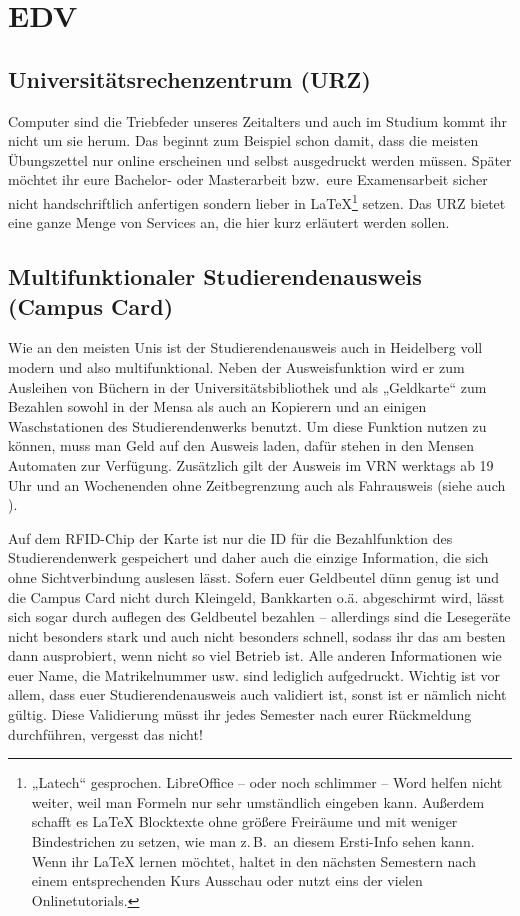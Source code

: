 \section{EDV}

\subsection{Universitätsrechenzentrum (URZ)}
\label{urz}
Computer sind die Triebfeder unseres Zeitalters und auch im Studium kommt ihr nicht um sie herum. Das beginnt zum Beispiel schon damit, dass die meisten Übungszettel nur online erscheinen und selbst ausgedruckt werden müssen. Später möchtet ihr eure Bachelor- oder Masterarbeit bzw.\ eure Examensarbeit sicher nicht handschriftlich anfertigen sondern lieber in \LaTeX \footnote{„Latech“ gesprochen. LibreOffice -- oder noch schlimmer -- Word helfen nicht weiter, weil man Formeln nur sehr umständlich eingeben kann. Außerdem schafft es \LaTeX{} Blocktexte ohne größere Freiräume und mit weniger Bindestrichen zu setzen, wie man z.\,B.\ an diesem Ersti-Info sehen kann. Wenn ihr \LaTeX{} lernen möchtet, haltet in den nächsten Semestern nach einem entsprechenden Kurs Ausschau oder nutzt eins der vielen Onlinetutorials.} setzen. Das \gls{URZ} bietet eine ganze Menge von Services an, die hier kurz erläutert werden sollen.

\subsection{Multifunktionaler Studierendenausweis (Campus Card)}
\label{campuscard}
Wie an den meisten Unis ist der Studierendenausweis auch in Heidelberg voll modern und also multifunktional. Neben der Ausweisfunktion wird er zum Ausleihen von Büchern in der Universitätsbibliothek und als „Geldkarte“ zum Bezahlen sowohl in der Mensa als auch an Kopierern und an einigen Waschstationen des Studierendenwerks benutzt. Um diese Funktion nutzen zu können, muss man Geld auf den Ausweis laden, dafür stehen in den Mensen Automaten zur Verfügung. Zusätzlich gilt der Ausweis im \gls{VRN} werktags ab 19 Uhr und an Wochenenden ohne Zeitbegrenzung auch als Fahrausweis (siehe auch ).

Auf dem RFID-Chip der Karte ist nur die ID für die Bezahlfunktion des Studierendenwerk gespeichert und daher auch die einzige Information, die sich ohne Sichtverbindung auslesen lässt. Sofern euer Geldbeutel dünn genug ist und die Campus Card nicht durch Kleingeld, Bankkarten o.ä. abgeschirmt wird, lässt sich sogar durch auflegen des Geldbeutel bezahlen -- allerdings sind die Lesegeräte nicht besonders stark und auch nicht besonders schnell, sodass ihr das am besten dann ausprobiert, wenn nicht so viel Betrieb ist. Alle anderen Informationen wie euer Name, die Matrikelnummer usw. sind lediglich aufgedruckt. Wichtig ist vor allem, dass euer Studierendenausweis auch validiert ist, sonst ist er nämlich nicht gültig. Diese Validierung müsst ihr jedes Semester nach eurer Rückmeldung durchführen, vergesst das nicht!

